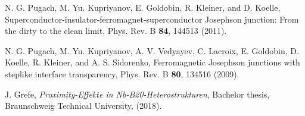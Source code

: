 \documentclass[prb,amsmath,amssymb,reprint]{revtex4-2}
\begin{document}
\begin{thebibliography}{99}
 N. G. Pugach, M. Yu. Kupriyanov, E. Goldobin, R. Kleiner, and D. Koelle,
Superconductor-insulator-ferromagnet-superconductor Josephson junction: From the dirty to the clean limit,
Phys. Rev. B \textbf{84}, 144513 (2011).

 N. G. Pugach, M. Yu. Kupriyanov, A. V. Vedyayev, C. Lacroix, E. Goldobin, D. Koelle, R. Kleiner, and A. S. Sidorenko,
Ferromagnetic Josephson junctions with steplike interface transparency,
Phys. Rev. B \textbf{80}, 134516 (2009).

J. Grefe,
{\em Proximity-Effekte in Nb-B20-Heterostrukturen},
Bachelor thesis, Braunschweig Technical University,
(2018).










%







\end{thebibliography}
\end{document}

